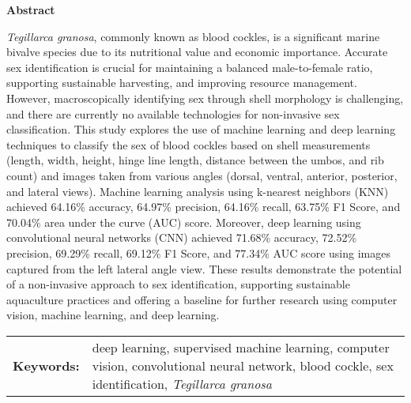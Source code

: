 \begin{center}
	\textbf{Abstract}
\end{center}
\setlength{\parindent}{0pt}
\textit{Tegillarca granosa}, commonly known as blood cockles, is a significant marine bivalve species due to its nutritional value and economic importance. Accurate sex identification is crucial for maintaining a balanced male-to-female ratio, supporting sustainable harvesting, and improving resource management. However, macroscopically identifying sex through shell morphology is challenging, and there are currently no available technologies for non-invasive sex classification. This study explores the use of machine learning and deep learning techniques to classify the sex of blood cockles based on shell measurements (length, width, height, hinge line length, distance between the umbos, and rib count) and images taken from various angles (dorsal, ventral, anterior, posterior, and lateral views). Machine learning analysis using k-nearest neighbors (KNN) achieved 64.16\% accuracy, 64.97\% precision, 64.16\% recall, 63.75\% F1 Score, and 70.04\% area under the curve (AUC) score. Moreover, deep learning using convolutional neural networks (CNN) achieved 71.68\% accuracy, 72.52\% precision, 69.29\% recall, 69.12\% F1 Score, and 77.34\% AUC score using images captured from the left lateral angle view. These results demonstrate the potential of a non-invasive approach to sex identification, supporting sustainable aquaculture practices and offering a baseline for further research using computer vision, machine learning, and deep learning.

\begin{tabular}{lp{4.25in}}
	\hspace{-0.5em}\textbf{Keywords:}\hspace{0.25em} & deep learning, supervised machine learning, computer vision, convolutional neural network, blood cockle, sex identification, \textit{Tegillarca granosa}\\
\end{tabular}
